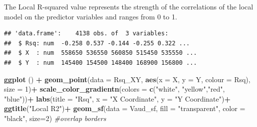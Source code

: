 \documentclass[
]{article}
\newenvironment{Shaded}{\begin{snugshade}}{\end{snugshade}}
\newcommand{\AttributeTok}[1]{\textcolor[rgb]{0.13,0.29,0.53}{#1}}
\newcommand{\CommentTok}[1]{\textcolor[rgb]{0.56,0.35,0.01}{\textit{#1}}}
\newcommand{\DecValTok}[1]{\textcolor[rgb]{0.00,0.00,0.81}{#1}}
\newcommand{\FunctionTok}[1]{\textcolor[rgb]{0.13,0.29,0.53}{\textbf{#1}}}
\newcommand{\NormalTok}[1]{#1}
\newcommand{\OtherTok}[1]{\textcolor[rgb]{0.56,0.35,0.01}{#1}}
\newcommand{\SpecialCharTok}[1]{\textcolor[rgb]{0.81,0.36,0.00}{\textbf{#1}}}
\newcommand{\StringTok}[1]{\textcolor[rgb]{0.31,0.60,0.02}{#1}}
\begin{document}
The Local R-squared value represents the strength of the correlations of the local model on the predictor variables and ranges from 0 to 1.

\begin{Shaded}
\end{Shaded}

\begin{verbatim}
## 'data.frame':    4138 obs. of  3 variables:
##  $ Rsq: num  -0.258 0.537 -0.144 -0.255 0.322 ...
##  $ X  : num  558650 536550 560850 515450 535550 ...
##  $ Y  : num  145400 154500 148400 168900 156800 ...
\end{verbatim}

\begin{Shaded}
\begin{Highlighting}[]
\FunctionTok{ggplot}\NormalTok{ () }\SpecialCharTok{+}
  \FunctionTok{geom\_point}\NormalTok{(}\AttributeTok{data =}\NormalTok{ Rsq\_XY, }\FunctionTok{aes}\NormalTok{(}\AttributeTok{x =}\NormalTok{ X, }\AttributeTok{y =}\NormalTok{ Y, }\AttributeTok{colour =}\NormalTok{ Rsq), }\AttributeTok{size =} \DecValTok{1}\NormalTok{)}\SpecialCharTok{+} 
  \FunctionTok{scale\_color\_gradientn}\NormalTok{(}\AttributeTok{colors =} \FunctionTok{c}\NormalTok{(}\StringTok{"white"}\NormalTok{, }\StringTok{"yellow"}\NormalTok{,}\StringTok{"red"}\NormalTok{, }\StringTok{"blue"}\NormalTok{))}\SpecialCharTok{+}
  \FunctionTok{labs}\NormalTok{(}\AttributeTok{title =} \StringTok{"Rsq"}\NormalTok{, }\AttributeTok{x =} \StringTok{"X Coordinate"}\NormalTok{, }\AttributeTok{y =} \StringTok{"Y Coordinate"}\NormalTok{)}\SpecialCharTok{+}
  \FunctionTok{ggtitle}\NormalTok{(}\StringTok{"Local R2"}\NormalTok{)}\SpecialCharTok{+}
  \FunctionTok{geom\_sf}\NormalTok{(}\AttributeTok{data =}\NormalTok{ Vaud\_sf, }\AttributeTok{fill =} \StringTok{"transparent"}\NormalTok{, }\AttributeTok{color =} \StringTok{"black"}\NormalTok{, }\AttributeTok{size=}\DecValTok{2}\NormalTok{) }\CommentTok{\#overlap borders}
\end{Highlighting}
\end{Shaded}
\end{document}
